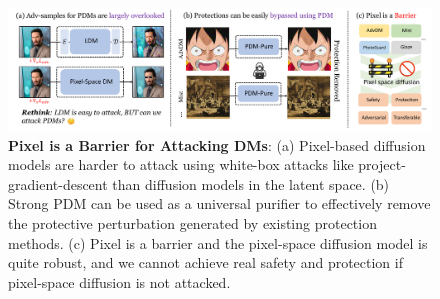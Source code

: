 \begin{figure}[t]
  \centering
\includegraphics[width=0.99\linewidth]{images/teaser.pdf}
  \vspace{-5pt}
  \caption{\textbf{Pixel is a Barrier for Attacking DMs}: (a) Pixel-based diffusion models are harder to attack using white-box attacks like project-gradient-descent than diffusion models in the latent space. (b) Strong PDM can be used as a universal purifier to effectively remove the protective perturbation generated by existing protection methods. (c) Pixel is a barrier and the pixel-space diffusion model is quite robust, and we cannot achieve real safety and protection if pixel-space diffusion is not attacked. }

  \label{fig:teaser}
  \vspace{-0.4cm}
\end{figure}
